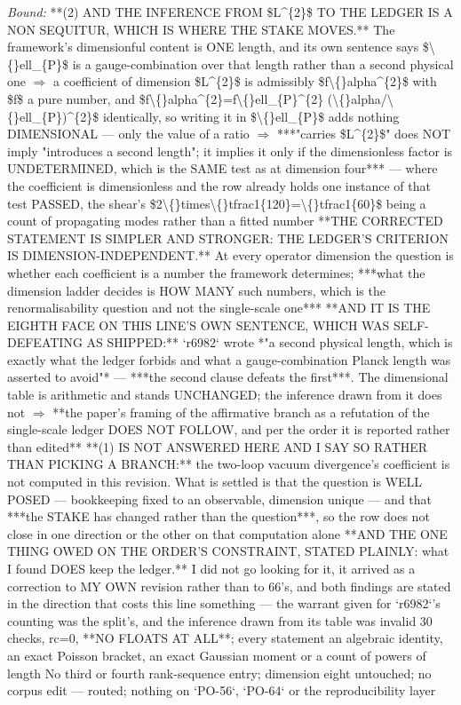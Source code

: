 \begin{description}
 \emph{Bound:}  **(2) AND THE INFERENCE FROM \$L\textasciicircum{}\{2\}\$ TO THE LEDGER IS A NON SEQUITUR, WHICH IS WHERE THE STAKE MOVES.** The framework's dimensionful content is ONE length, and its own sentence says \$\textbackslash\{\}ell\_\{P\}\$ is a gauge-combination over that length rather than a second physical one \ensuremath{\Rightarrow} a coefficient of dimension \$L\textasciicircum{}\{2\}\$ is admissibly \$f\textbackslash\{\}alpha\textasciicircum{}\{2\}\$ with \$f\$ a pure number, and \$f\textbackslash\{\}alpha\textasciicircum{}\{2\}=f\textbackslash\{\}ell\_\{P\}\textasciicircum{}\{2\} (\textbackslash\{\}alpha/\textbackslash\{\}ell\_\{P\})\textasciicircum{}\{2\}\$ identically, so writing it in \$\textbackslash\{\}ell\_\{P\}\$ adds nothing DIMENSIONAL --- only the value of a ratio \ensuremath{\Rightarrow} ***"carries \$L\textasciicircum{}\{2\}\$" does NOT imply "introduces a second length"; it implies it only if the dimensionless factor is UNDETERMINED, which is the SAME test as at dimension four*** --- where the coefficient is dimensionless and the row already holds one instance of that test PASSED, the shear's \$2\textbackslash\{\}times\textbackslash\{\}tfrac1\{120\}=\textbackslash\{\}tfrac1\{60\}\$ being a count of propagating modes rather than a fitted number  **THE CORRECTED STATEMENT IS SIMPLER AND STRONGER: THE LEDGER'S CRITERION IS DIMENSION-INDEPENDENT.** At every operator dimension the question is whether each coefficient is a number the framework determines; ***what the dimension ladder decides is HOW MANY such numbers, which is the renormalisability question and not the single-scale one***   **AND IT IS THE EIGHTH FACE ON THIS LINE'S OWN SENTENCE, WHICH WAS SELF-DEFEATING AS SHIPPED:** `r6982` wrote *"a second physical length, which is exactly what the ledger forbids and what a gauge-combination Planck length was asserted to avoid"* --- ***the second clause defeats the first***. The dimensional table is arithmetic and stands UNCHANGED; the inference drawn from it does not \ensuremath{\Rightarrow} **the paper's framing of the affirmative branch as a refutation of the single-scale ledger DOES NOT FOLLOW, and per the order it is reported rather than edited**   **(1) IS NOT ANSWERED HERE AND I SAY SO RATHER THAN PICKING A BRANCH:** the two-loop vacuum divergence's coefficient is not computed in this revision. What is settled is that the question is WELL POSED --- bookkeeping fixed to an observable, dimension unique --- and that ***the STAKE has changed rather than the question***, so the row does not close in one direction or the other on that computation alone   **AND THE ONE THING OWED ON THE ORDER'S CONSTRAINT, STATED PLAINLY: what I found DOES keep the ledger.** I did not go looking for it, it arrived as a correction to MY OWN revision rather than to 66's, and both findings are stated in the direction that costs this line something --- the warrant given for `r6982`'s counting was the split's, and the inference drawn from its table was invalid  30 checks, rc=0, **NO FLOATS AT ALL**; every statement an algebraic identity, an exact Poisson bracket, an exact Gaussian moment or a count of powers of length  No third or fourth rank-sequence entry; dimension eight untouched; no corpus edit --- routed; nothing on `PO-56`, `PO-64` or the reproducibility layer

\end{description}
